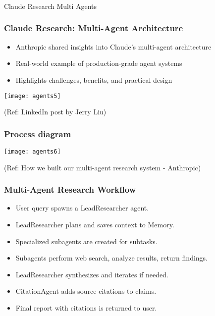 \begin{frame}[fragile]\frametitle{}
\begin{center}
{\Large Claude Research Multi Agents}
\end{center}
\end{frame}

\begin{frame}[fragile]\frametitle{Claude Research: Multi-Agent Architecture}

    \begin{itemize}
        \item Anthropic shared insights into Claude's multi-agent architecture
        \item Real-world example of production-grade agent systems
        \item Highlights challenges, benefits, and practical design
    \end{itemize}
  
	
	\begin{center}
	\texttt{[image: agents5]}
	\end{center}
	
{\tiny (Ref: LinkedIn post by Jerry Liu)}

\end{frame}

\begin{frame}[fragile]\frametitle{Process diagram}
	
	\begin{center}
	\texttt{[image: agents6]}
	\end{center}
	
{\tiny (Ref: How we built our multi-agent research system - Anthropic)}

\end{frame}

\begin{frame}[fragile]\frametitle{Multi-Agent Research Workflow}
    \begin{itemize}
        \item User query spawns a LeadResearcher agent.
        \item LeadResearcher plans and saves context to Memory.
        \item Specialized subagents are created for subtasks.
        \item Subagents perform web search, analyze results, return findings.
        \item LeadResearcher synthesizes and iterates if needed.
        \item CitationAgent adds source citations to claims.
        \item Final report with citations is returned to user.
    \end{itemize}
\end{frame}

